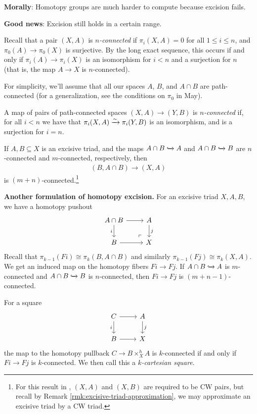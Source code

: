 \documentclass{article}[11pt]
\begin{document}
\textbf{Morally}: Homotopy groups are much harder to compute because excision fails.

\textbf{Good news}: Excision still holds in a certain range.

Recall that a pair $(X,A)$ is \textit{$n$-connected} if $\pi_i(X,A)=0$ for all $1\leq i \leq n$, and $\pi_0 (A) \to \pi_0(X)$ is surjective. By the long exact sequence, this occurs if and only if $\pi_i(A) \to \pi_i(X)$ is an isomorphism for $i<n$ and a surjection for $n$ (that is, the map $A\to X$ is $n$-connected).

For simplicity, we'll assume that all our spaces $A$, $B$, and $A\cap B$ are path-connected (for a generalization, see the conditions on $\pi_0$ in May).

\begin{definition} A map of pairs of path-connected spaces $(X,A) \to (Y,B)$ is \textit{$n$-connected} if, for all $i<n$ we have that $\pi_i(X,A) \xrightarrow{\sim} \pi_i(Y,B)$ is an isomorphism, and is a surjection for $i=n$.
\end{definition}

\begin{theorem} If $A,B\subseteq X$ is an excisive triad, and the maps $A\cap B \xhookrightarrow{} A$ and $A\cap B \xhookrightarrow{} B$ are $n$-connected and $m$-connected, respectively, then
\begin{align*}
	(B, A\cap B) \to (X,A)
\end{align*}
is $(m+n)$-connected.\footnote{For this result in \cite{hatcher}, $(X,A)$ and $(X,B)$ are required to be CW pairs, but recall by Remark \ref{rmk:excisive-triad-approximation}, we may approximate an excisive triad by a CW triad.}
\end{theorem}

\textbf{Another formulation of homotopy excision.} For an excisive triad $X,A,B$, we have a homotopy pushout
\[
	\begin{tikzcd}
	A\cap B\rar\dar["i" left] & A\dar["j" right] \\
	B\rar & X\po
	\end{tikzcd}
\]
Recall that $\pi_{k-1}(Fi) \cong \pi_k(B, A\cap B)$ and similarly $\pi_{k-1}(Fj) \cong \pi_k(X, A)$. We get an induced map on the homotopy fibers $Fi \to Fj$. If $A\cap B\xhookrightarrow{} A$ is $m$-connected and $A\cap B\xhookrightarrow{} B$ is $n$-connected, then $Fi \to Fj$ is $(m+n-1)$-connected.


\begin{exercise} For a square
\[
	\begin{tikzcd}
	C\dar["i" left]\rar & A\dar["j" right] \\
	B\rar & X
	\end{tikzcd}
\]
the map to the homotopy pullback $C\to B\times_X^h A$ is $k$-connected if and only if $Fi \to Fj$ is $k$-connected. We then call this a \textit{$k$-cartesian square}.
\end{exercise}
\end{document}
